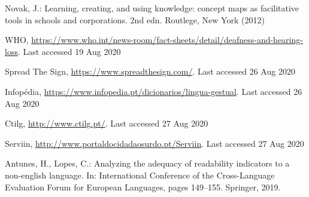 \documentclass[runningheads]{llncs}
\begin{document}
%
%
%
% 
% 
%
\begin{thebibliography}{8}
        Novak, J.: Learning, creating, and using knowledge: concept maps as facilitative tools in schools and corporations. 2nd edn. Routlege, New York (2012)

        WHO, \url{https://www.who.int/news-room/fact-sheets/detail/deafness-and-hearing-loss}. Last accessed 19 Aug 2020

        Spread The Sign, \url{https://www.spreadthesign.com/}. Last accessed 26 Aug 2020

        Infopédia, \url{https://www.infopedia.pt/dicionarios/lingua-gestual}. Last accessed 26 Aug 2020

        Ctilg, \url{http://www.ctilg.pt/}. Last accessed 27 Aug 2020

        Serviin, \url{http://www.portaldocidadaosurdo.pt/Serviin}. Last accessed 27 Aug 2020

        Antunes, H., Lopes, C.: Analyzing the adequacy of readability indicators to a non-english language.
        In: International Conference of the Cross-Language Evaluation Forum for European Languages,
        pages 149--155. Springer, 2019.





\end{thebibliography}
\end{document}

